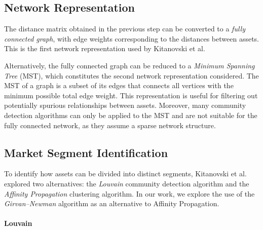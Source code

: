\documentclass[acmsmall,screen,nonacm]{acmart}
\begin{document}
\subsection{Network Representation} \label{netrepr}

The distance matrix obtained in the previous step can be converted to a \emph{fully connected graph}, with edge weights corresponding to the distances between assets.
This is the first network representation used by Kitanovski et al.

Alternatively, the fully connected graph can be reduced to a \emph{Minimum Spanning Tree} (MST), which constitutes the second network representation considered.
The MST of a graph is a subset of its edges that connects all vertices with the minimum possible total edge weight.
This representation is useful for filtering out potentially spurious relationships between assets.
Moreover, many community detection algorithms can only be applied to the MST and are not suitable for the fully connected network, as they assume a sparse network structure.

\subsection{Market Segment Identification}

To identify how assets can be divided into distinct segments, Kitanovski et al. explored two alternatives: the \emph{Louvain} community detection algorithm and the \emph{Affinity Propagation} clustering algorithm.
In our work, we explore the use of the \emph{Girvan–Newman} algorithm as an alternative to Affinity Propagation.

\paragraph{Louvain}
\end{document}
